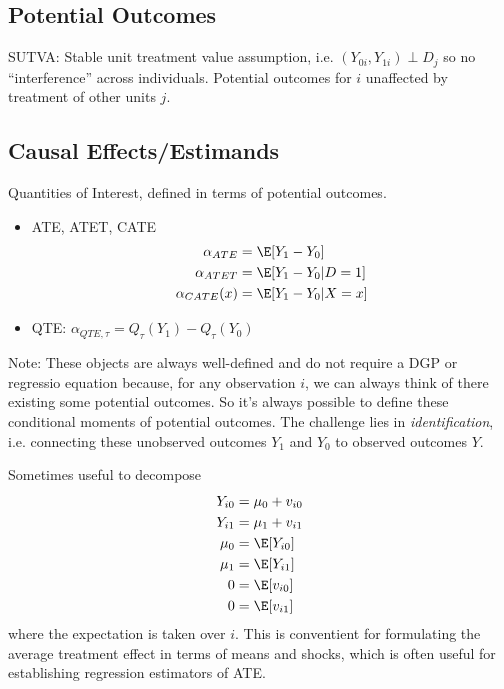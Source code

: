 \documentclass[12pt]{article}
\theoremstyle{plain}
\theoremstyle{definition}
\theoremstyle{remark}
\begin{document}
\clearpage
\subsection{Potential Outcomes}

SUTVA:
Stable unit treatment value assumption, i.e.
$(Y_{0i},Y_{1i})\perp D_j$ so no ``interference'' across
individuals.
Potential outcomes for $i$ unaffected by treatment of other
units $j$.



\clearpage
\subsection{Causal Effects/Estimands}

Quantities of Interest, defined in terms of potential outcomes.
\begin{itemize}
  \item ATE, ATET, CATE
    \begin{align*}
      \alpha_{ATE}
      &=\E[Y_1-Y_0]
      \\
      \alpha_{ATET}
      &=\E[Y_1-Y_0|D=1]
      \\
      \alpha_{CATE}(x)
      &=\E[Y_1-Y_0|X=x]
    \end{align*}
  \item QTE: $\alpha_{QTE,\tau}=Q_\tau(Y_1)-Q_\tau(Y_0)$
\end{itemize}
Note:
These objects are always well-defined and do not require a DGP or
regressio equation because, for any observation $i$,  we can always
think of there existing some potential outcomes.
So it's always possible to define these conditional moments of
potential outcomes.
The challenge lies in \emph{identification}, i.e. connecting these
unobserved outcomes $Y_1$ and $Y_0$ to observed outcomes $Y$.

Sometimes useful to decompose
\begin{align*}
  Y_{i0} &= \mu_0 + v_{i0} \\
  Y_{i1} &= \mu_1 + v_{i1} \\
  \mu_0 &= \E[Y_{i0}] \\
  \mu_1 &= \E[Y_{i1}] \\
  0 &= \E[v_{i0}] \\
  0 &= \E[v_{i1}] \\
\end{align*}
where the expectation is taken over $i$.
This is conventient for formulating the average treatment effect in
terms of means and shocks, which is often useful for establishing
regression estimators of ATE.
\end{document}
